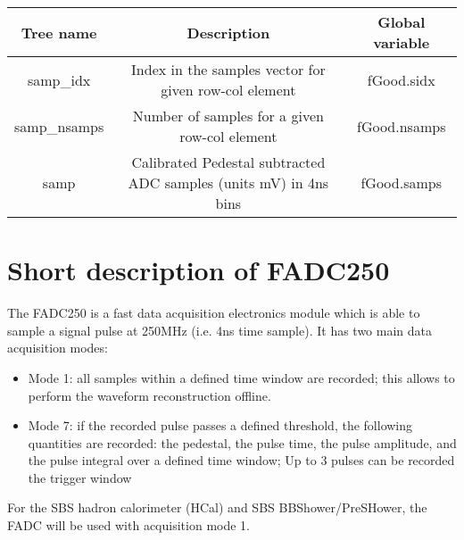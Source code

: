 \documentclass[11pt]{article}
\begin{document}
\begin{center}
	\begin{tabular}{|c|c|c|}
	\hline 
	Tree name	& Description &  Global variable\\ 
	\hline 
	samp\_idx 	& Index in the samples vector for given row-col element &fGood.sidx  \\ 
	\hline 
	samp\_nsamps	& Number of samples for a given row-col element &fGood.nsamps  \\ 
\hline 
	samp 	& Calibrated Pedestal subtracted ADC samples (units mV) in 4ns bins &fGood.samps  \\ 
\hline 
\end{tabular} 
\end{center}




\section{Short description of FADC250}
The FADC250 is a fast data acquisition electronics module which is able to sample a signal pulse at 250MHz (i.e. 4ns time sample).
It has two main data acquisition modes:
%
\begin{itemize}
	\item{Mode 1: all samples within a defined time window are recorded; this allows to perform the waveform reconstruction offline.}
	\item{Mode 7: if the recorded pulse passes a defined threshold, the following quantities are recorded: the pedestal, the pulse time, the pulse amplitude, and the pulse integral over a defined time window; Up to 3 pulses can be recorded the trigger window}
\end{itemize}
%
For the SBS hadron calorimeter (HCal) and SBS BBShower/PreSHower, the FADC will be used with acquisition mode 1.
\end{document}
